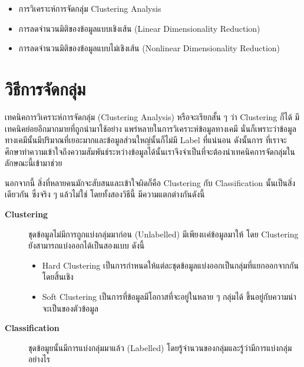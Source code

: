 \begin{itemize}[topsep=0pt]
    \item การวิเคราะห์การจัดกลุ่ม Clustering Analysis
    
    \item การลดจำนวนมิติของข้อมูลแบบเชิงเส้น (Linear Dimensionality Reduction)
    
    \item การลดจำนวนมิติของข้อมูลแบบไม่เชิงเส้น (Nonlinear Dimensionality Reduction)
\end{itemize}

\section{วิธีการจัดกลุ่ม}
\label{sec:clustering}

เทคนิคการวิเคราะห์การจัดกลุ่ม (Clustering Analysis) หรือจะเรียกสั้น ๆ ว่า Clustering ก็ได้ มีเทคนิคย่อยอีกมากมายที่ถูกนำมาใช้อย่าง%
แพร่หลายในการวิเคราะห์ข้อมูลทางเคมี นั่นก็เพราะว่าข้อมูลทางเคมีนั้นมีปริมาณที่เยอะมากและข้อมูลส่วนใหญ่นั้นก็ไม่มี Label ที่แน่นอน ดังนั้นการ%
ที่เราจะศึกษาทำความเข้าใจถึงความสัมพันธ์ระหว่างข้อมูลได้นั้นเราจึงจำเป็นที่จะต้องนำเทคนิคการจัดกลุ่มในลักษณะนี้เข้ามาช่วย

นอกจากนี้ สิ่งที่หลายคนมักจะสับสนและเข้าใจผิดก็คือ Clustering กับ Classification นั้นเป็นสิ่งเดียวกัน ซึ่งจริง ๆ แล้วไม่ใช่ โดยทั้งสองวิธีนี้%
มีความแตกต่างกันดังนี้

\begin{description}
    \item[\textbf{Clustering}] ชุดข้อมูลไม่มีการถูกแบ่งกลุ่มมาก่อน (Unlabelled) มีเพียงเเค่ข้อมูลมาให้ โดย Clustering 
    ยังสามารถแบ่งออกได้เป็นสองแบบ ดังนี้
    \begin{itemize}
        \item Hard Clustering เป็นการกำหนดให้แต่ละชุดข้อมูลแบ่งออกเป็นกลุ่มที่แยกออกจากกันโดยสิ้นเชิง
        
        \item Soft Clustering เป็นการที่ข้อมูลมีโอกาสที่จะอยู่ในหลาย ๆ กลุ่มได้ ขึ้นอยู่กับความน่าจะเป็นของตัวข้อมูล
    \end{itemize}
    \item[\textbf{Classification}] ชุดข้อมูยนั้นมีการแบ่งกลุ่มมาแล้ว (Labelled) โดยรู้จำนวนของกลุ่มและรู้ว่ามีการแบ่งกลุ่มอย่างไร
\end{description}


